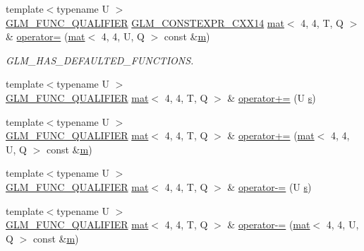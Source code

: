 \begin{DoxyCompactItemize}
\item 
{\footnotesize template$<$typename U $>$ }\\\hyperlink{setup_8hpp_a33fdea6f91c5f834105f7415e2a64407}{G\+L\+M\+\_\+\+F\+U\+N\+C\+\_\+\+Q\+U\+A\+L\+I\+F\+I\+ER} \hyperlink{setup_8hpp_a4dd12abf5e1164bc57f3a34671d03844}{G\+L\+M\+\_\+\+C\+O\+N\+S\+T\+E\+X\+P\+R\+\_\+\+C\+X\+X14} \hyperlink{structglm_1_1mat}{mat}$<$ 4, 4, T, Q $>$ \& \hyperlink{structglm_1_1mat_3_014_00_014_00_01_t_00_01_q_01_4_a835f3a0f213fcc160f198bf98c9b5bf0}{operator=} (\hyperlink{structglm_1_1mat}{mat}$<$ 4, 4, U, Q $>$ const \&\hyperlink{_s_d_l__opengl__glext_8h_af593500c283bf1a787a6f947f503a5c2}{m})
\begin{DoxyCompactList}\small\item\em G\+L\+M\+\_\+\+H\+A\+S\+\_\+\+D\+E\+F\+A\+U\+L\+T\+E\+D\+\_\+\+F\+U\+N\+C\+T\+I\+O\+NS. \end{DoxyCompactList}\item 
{\footnotesize template$<$typename U $>$ }\\\hyperlink{setup_8hpp_a33fdea6f91c5f834105f7415e2a64407}{G\+L\+M\+\_\+\+F\+U\+N\+C\+\_\+\+Q\+U\+A\+L\+I\+F\+I\+ER} \hyperlink{structglm_1_1mat}{mat}$<$ 4, 4, T, Q $>$ \& \hyperlink{structglm_1_1mat_3_014_00_014_00_01_t_00_01_q_01_4_a78e8853303a6899f72b463c9075c4599}{operator+=} (U \hyperlink{_s_d_l__opengl_8h_a4af680a6c683f88ed67b76f207f2e6e4}{s})
\item 
{\footnotesize template$<$typename U $>$ }\\\hyperlink{setup_8hpp_a33fdea6f91c5f834105f7415e2a64407}{G\+L\+M\+\_\+\+F\+U\+N\+C\+\_\+\+Q\+U\+A\+L\+I\+F\+I\+ER} \hyperlink{structglm_1_1mat}{mat}$<$ 4, 4, T, Q $>$ \& \hyperlink{structglm_1_1mat_3_014_00_014_00_01_t_00_01_q_01_4_a408fc5e603bd8cabac8c493c57533821}{operator+=} (\hyperlink{structglm_1_1mat}{mat}$<$ 4, 4, U, Q $>$ const \&\hyperlink{_s_d_l__opengl__glext_8h_af593500c283bf1a787a6f947f503a5c2}{m})
\item 
{\footnotesize template$<$typename U $>$ }\\\hyperlink{setup_8hpp_a33fdea6f91c5f834105f7415e2a64407}{G\+L\+M\+\_\+\+F\+U\+N\+C\+\_\+\+Q\+U\+A\+L\+I\+F\+I\+ER} \hyperlink{structglm_1_1mat}{mat}$<$ 4, 4, T, Q $>$ \& \hyperlink{structglm_1_1mat_3_014_00_014_00_01_t_00_01_q_01_4_aecbd6fe73f2df0690098bbfadc48863d}{operator-\/=} (U \hyperlink{_s_d_l__opengl_8h_a4af680a6c683f88ed67b76f207f2e6e4}{s})
\item 
{\footnotesize template$<$typename U $>$ }\\\hyperlink{setup_8hpp_a33fdea6f91c5f834105f7415e2a64407}{G\+L\+M\+\_\+\+F\+U\+N\+C\+\_\+\+Q\+U\+A\+L\+I\+F\+I\+ER} \hyperlink{structglm_1_1mat}{mat}$<$ 4, 4, T, Q $>$ \& \hyperlink{structglm_1_1mat_3_014_00_014_00_01_t_00_01_q_01_4_aefa852deacee364e0a9526f829ddf85a}{operator-\/=} (\hyperlink{structglm_1_1mat}{mat}$<$ 4, 4, U, Q $>$ const \&\hyperlink{_s_d_l__opengl__glext_8h_af593500c283bf1a787a6f947f503a5c2}{m})

\end{DoxyCompactItemize}
